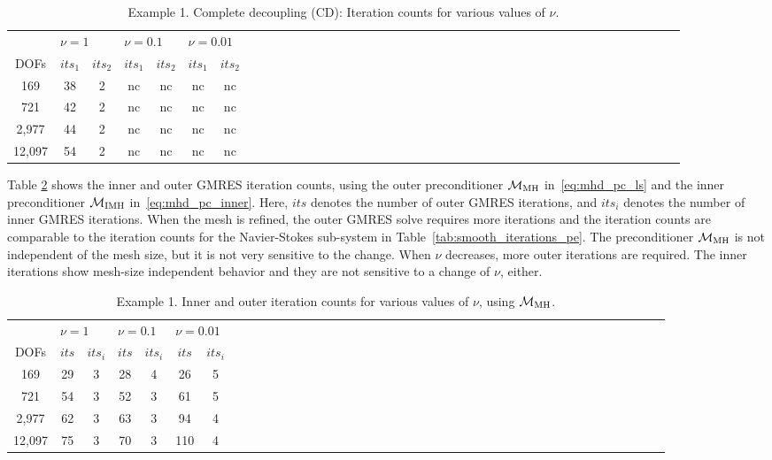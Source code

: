 \documentclass{siamltex}
\begin{document}
\begin{table}[!ht]
\begin{center}
\begin{tabular}{cccccccccccccccccccccccccccccccccccccccccc}
\hline
& \multicolumn{2}{l}{$\nu=1$} & \multicolumn{2}{l}{$\nu=0.1$} & \multicolumn{2}{l}{$\nu=0.01$} \\
DOFs & $its_1$ & $its_2$ & $its_1$ & $its_2$ & $its_1$ & $its_2$\\
\hline
169 & 38 & 2 & nc & nc & nc & nc\\
721 & 42 & 2 & nc & nc & nc & nc \\
2,977 & 44 & 2 & nc & nc & nc & nc\\
12,097 & 54 & 2 & nc & nc & nc & nc\\
\hline
\end{tabular}
\caption{Example 1. Complete decoupling (CD): Iteration counts for various values of $\nu$.}
\label{tab:smooth_iterations_ps}
\end{center}
\end{table}

Table \ref{tab:smooth_iterations_pc} shows the inner and outer GMRES iteration counts, using the outer preconditioner $\mathcal{M}_{\rm MH}$ in~\eqref{eq:mhd_pc_ls} and the inner preconditioner $\mathcal{M}_{\rm IMH}$ in~\eqref{eq:mhd_pc_inner}. Here, $its$ denotes the number of outer GMRES iterations, and $its_i$ denotes the number of inner GMRES iterations. When the mesh is refined, the outer GMRES solve requires more iterations and the iteration counts are comparable to the iteration counts for the Navier-Stokes sub-system in Table~\ref{tab:smooth_iterations_pe}. The preconditioner $\mathcal{M}_{\rm MH}$ is not independent of the mesh size, but it is not very sensitive to the change. When $\nu$ decreases, more outer iterations are required. The inner iterations show mesh-size independent behavior and they are not sensitive to a change of $\nu$, either.

\begin{table}[!ht]
\begin{center}
\begin{tabular}{cccccccccccccccccccccccccccccccccccccccccc}
\hline
& \multicolumn{2}{l}{$\nu=1$} & \multicolumn{2}{l}{$\nu=0.1$} & \multicolumn{2}{l}{$\nu=0.01$} \\
DOFs & $its$ & $its_i$ & $its$ & $its_i$ & $its$ & $its_i$\\
\hline
169 & 29 & 3 & 28 & 4 & 26 & 5\\
721 & 54 & 3 & 52 & 3 & 61 & 5 \\
2,977 & 62 & 3 & 63 & 3 & 94 & 4\\
12,097 & 75 & 3 & 70 & 3 & 110 & 4\\
\hline
\end{tabular}
\caption{Example 1. Inner and outer iteration counts for various values of $\nu$, using $\mathcal{M}_{\rm MH}$.}
\label{tab:smooth_iterations_pc}
\end{center}
\end{table}
\end{document}
